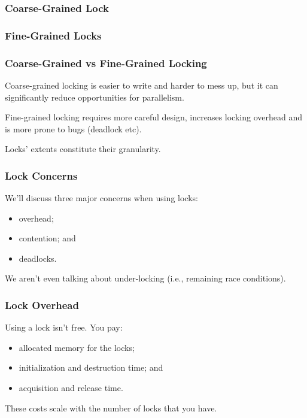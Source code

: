 \begin{frame}
\frametitle{Coarse-Grained Lock}

  \begin{center}
    
  \end{center}

\end{frame}

\begin{frame}
\frametitle{Fine-Grained Locks}

  \begin{center}
    
  \end{center}

\end{frame}

\begin{frame}
\frametitle{Coarse-Grained vs Fine-Grained Locking}

\alert{Coarse-grained} locking is easier to write and harder to mess up, but it can significantly reduce opportunities for parallelism. 

\alert{Fine-grained locking} requires more careful design,
increases locking overhead and is more prone to bugs (deadlock etc).  


Locks' extents constitute their granularity. 

\end{frame}


\begin{frame}
\frametitle{Lock Concerns}

We'll discuss three major concerns when using locks:
  \begin{itemize}
    \item overhead;
    \item contention; and
    \item deadlocks.
  \end{itemize}
  
  
We aren't even talking about under-locking (i.e., remaining race conditions).

\end{frame}

\begin{frame}
\frametitle{Lock Overhead}

  Using a lock isn't free. You pay:
  \begin{itemize}
    \item allocated memory for the locks;
    \item initialization and destruction time; and
    \item acquisition and release time.
  \end{itemize}


  These costs scale with the number of locks that you have.
\end{frame}


